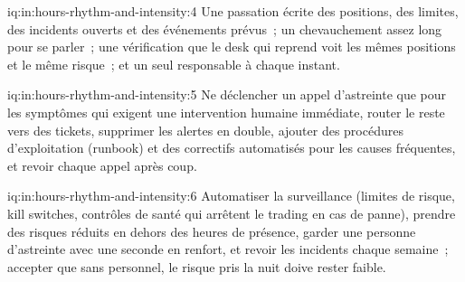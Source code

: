 \begin{solution}{iq:in:hours-rhythm-and-intensity:4}
Une passation écrite des positions, des limites, des incidents ouverts et des événements prévus~; un chevauchement assez long pour se parler~; une vérification que le
desk qui reprend voit les mêmes positions et le même risque~; et un seul responsable à chaque instant.
\end{solution}

\begin{solution}{iq:in:hours-rhythm-and-intensity:5}
Ne déclencher un appel d'astreinte que pour les symptômes qui exigent une intervention humaine immédiate, router le reste vers des tickets, supprimer les alertes en double, ajouter des procédures d'exploitation (runbook) et
des correctifs automatisés pour les causes fréquentes, et revoir chaque appel après coup.
\end{solution}

\begin{solution}{iq:in:hours-rhythm-and-intensity:6}
Automatiser la surveillance (limites de risque, kill switches, contrôles de santé qui arrêtent le trading en cas de panne), prendre des risques réduits en dehors
des heures de présence, garder une personne d'astreinte avec une seconde en renfort, et revoir les incidents chaque semaine~; accepter que
sans personnel, le risque pris la nuit doive rester faible.
\end{solution}
